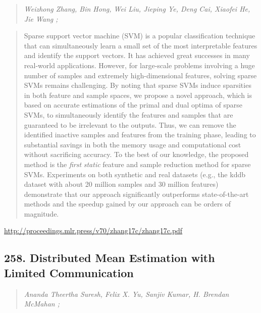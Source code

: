 \documentclass{article}
\begin{document}
\begin{quote}
\footnotesize{\textit{Weizhong Zhang, Bin Hong, Wei Liu, Jieping Ye, Deng Cai, Xiaofei He, Jie Wang ;}}
\end{quote}

\begin{quote}
    Sparse support vector machine (SVM) is a popular classification technique that can simultaneously learn a small set of the most interpretable features and identify the support vectors. It has achieved great successes in many real-world applications. However, for large-scale problems involving a huge number of samples and extremely high-dimensional features, solving sparse SVMs remains challenging. By noting that sparse SVMs induce sparsities in both feature and sample spaces, we propose a novel approach, which is based on accurate estimations of the primal and dual optima of sparse SVMs, to simultaneously identify the features and samples that are guaranteed to be irrelevant to the outputs. Thus, we can remove the identified inactive samples and features from the training phase, leading to substantial savings in both the memory usage and computational cost without sacrificing accuracy. To the best of our knowledge, the proposed method is the \textit{first} \textit{static} feature and sample reduction method for sparse SVMs. Experiments on both synthetic and real datasets (e.g., the kddb dataset with about 20 million samples and 30 million features) demonstrate that our approach significantly outperforms state-of-the-art methods and the speedup gained by our approach can be orders of magnitude.  \end{quote}

\href{http://proceedings.mlr.press/v70/zhang17c/zhang17c.pdf}{http://proceedings.mlr.press/v70/zhang17c/zhang17c.pdf}

\subsection{258. Distributed Mean Estimation with Limited Communication}

\begin{quote}
\footnotesize{\textit{Ananda Theertha Suresh, Felix X. Yu, Sanjiv Kumar, H. Brendan McMahan ;}}
\end{quote}
\end{document}
